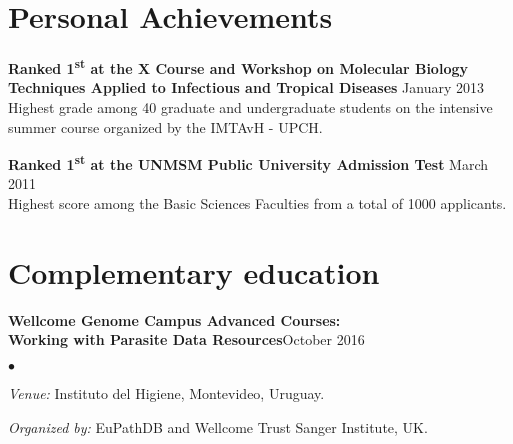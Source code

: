 \documentclass[margin,line]{res}
\newenvironment{list2}{
  \begin{list}{$\bullet$}{%
      \setlength{\itemsep}{0in}
      \setlength{\parsep}{0in} \setlength{\parskip}{0in}
      \setlength{\topsep}{0in} \setlength{\partopsep}{0in}
      \setlength{\leftmargin}{0.2in}}}{\end{list}}
\begin{document}
\begin{resume}
\newpage

\section{\sc Personal Achievements}

{\bf Ranked 1\textsuperscript{st} at the X Course and Workshop on Molecular Biology \\Techniques Applied to Infectious and Tropical Diseases} \hfill January 2013\\
Highest grade among 40 graduate and undergraduate students on the intensive summer course organized by the IMTAvH - UPCH.

{\bf Ranked 1\textsuperscript{st} at the UNMSM Public University Admission Test} \hfill March 2011\\
Highest score among the Basic Sciences Faculties from a total of 1000 applicants.\\%

\section{\sc Complementary education}

{\bf Wellcome Genome Campus Advanced Courses:\\Working with Parasite Data Resources}\hfill {October 2016}\\
	\vspace*{-.1in}%
\begin{list2} %
	\item \textit{Venue:} Instituto del Higiene, Montevideo, Uruguay.%
	\item \textit{Organized by:} EuPathDB and Wellcome Trust Sanger Institute, UK. %
\end{list2}


\end{resume}
\end{document}
